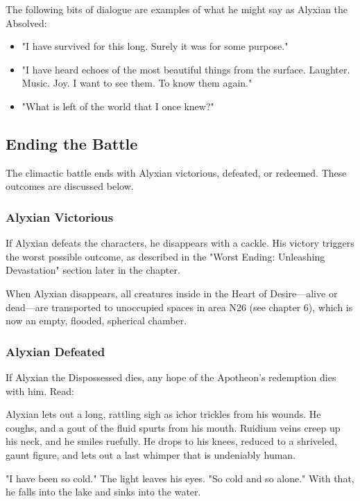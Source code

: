 \documentclass[10pt,a4paper,twoside,twocolumn,openany,nodeprecatedcode]{dndbook}
\begin{document}
The following bits of dialogue are examples of what he might say as Alyxian the Absolved:


\begin{itemize}
\item "I have survived for this long. Surely it was for some purpose."
\item "I have heard echoes of the most beautiful things from the surface. Laughter. Music. Joy. I want to see them. To know them again."
\item "What is left of the world that I once knew?"
\end{itemize}

\subsection{Ending the Battle}
The climactic battle ends with Alyxian victorious, defeated, or redeemed. These outcomes are discussed below.

\subsubsection{Alyxian Victorious}
If Alyxian defeats the characters, he disappears with a cackle. His victory triggers the worst possible outcome, as described in the "Worst Ending: Unleashing Devastation" section later in the chapter.

When Alyxian disappears, all creatures inside in the Heart of Desire—alive or dead—are transported to unoccupied spaces in area N26 (see chapter 6), which is now an empty, flooded, spherical chamber.

\subsubsection{Alyxian Defeated}
If Alyxian the Dispossessed dies, any hope of the Apotheon's redemption dies with him. Read:

\begin{DndReadAloud}{}
Alyxian lets out a long, rattling sigh as ichor trickles from his wounds. He coughs, and a gout of the fluid spurts from his mouth. Ruidium veins creep up his neck, and he smiles ruefully. He drops to his knees, reduced to a shriveled, gaunt figure, and lets out a last whimper that is undeniably human.

"I have been so cold." The light leaves his eyes. "So cold and so alone." With that, he falls into the lake and sinks into the water.

\end{DndReadAloud}
\end{document}
